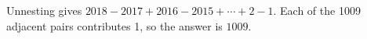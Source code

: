 Unnesting gives $ 2018-2017+2016-2015+\cdots+2-1 $. Each of the 1009 adjacent pairs contributes 1, so the answer is $\boxed{1009}$.
